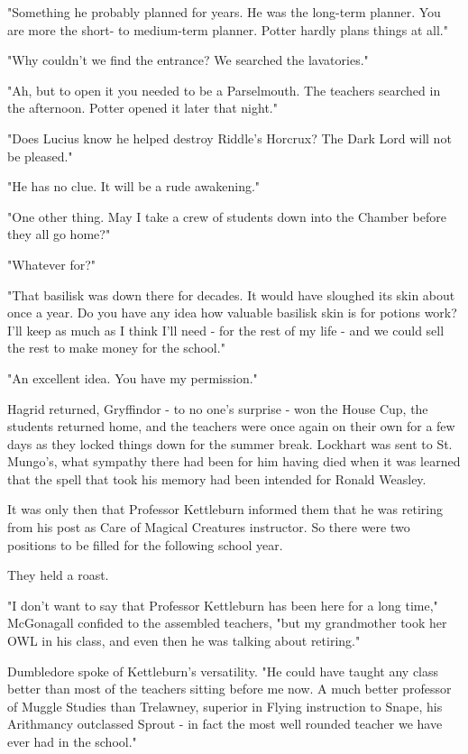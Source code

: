 \documentclass[a4paper,11pt]{article}
\begin{document}
"Something he probably planned for years. He was the long-term planner. You are more the short- to medium-term planner. Potter hardly plans things at all."

"Why couldn't we find the entrance? We searched the lavatories."

"Ah, but to open it you needed to be a Parselmouth. The teachers searched in the afternoon. Potter opened it later that night."

"Does Lucius know he helped destroy Riddle's Horcrux? The Dark Lord will not be pleased."

"He has no clue. It will be a rude awakening."

"One other thing. May I take a crew of students down into the Chamber before they all go home?"

"Whatever for?"

"That basilisk was down there for decades. It would have sloughed its skin about once a year. Do you have any idea how valuable basilisk skin is for potions work? I'll keep as much as I think I'll need - for the rest of my life - and we could sell the rest to make money for the school."

"An excellent idea. You have my permission."

Hagrid returned, Gryffindor - to no one's surprise - won the House Cup, the students returned home, and the teachers were once again on their own for a few days as they locked things down for the summer break. Lockhart was sent to St. Mungo's, what sympathy there had been for him having died when it was learned that the spell that took his memory had been intended for Ronald Weasley.

It was only then that Professor Kettleburn informed them that he was retiring from his post as Care of Magical Creatures instructor. So there were two positions to be filled for the following school year.

They held a roast.

"I don't want to say that Professor Kettleburn has been here for a long time," McGonagall confided to the assembled teachers, "but my grandmother took her OWL in his class, and even then he was talking about retiring."

Dumbledore spoke of Kettleburn's versatility. "He could have taught any class better than most of the teachers sitting before me now. A much better professor of Muggle Studies than Trelawney, superior in Flying instruction to Snape, his Arithmancy outclassed Sprout - in fact the most well rounded teacher we have ever had in the school."
\end{document}
